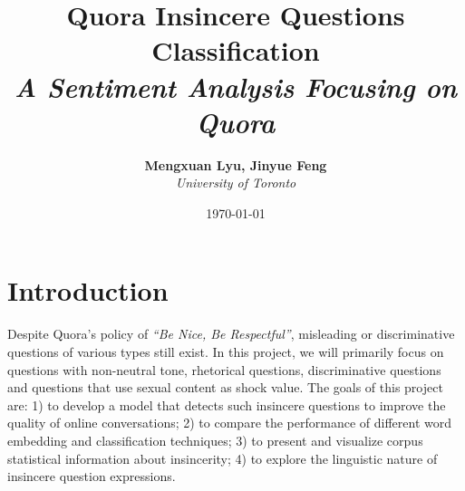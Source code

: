 \documentclass[12pt]{diazessay} %
\title{\textbf{Quora Insincere Questions Classification} \\ {\Large\itshape A Sentiment Analysis Focusing on Quora}} %
\author{\textbf{Mengxuan Lyu, Jinyue Feng} \\ \textit{University of Toronto}} %
\date{\today} %
\begin{document}
\maketitle %






\doublespacing %

\section{Introduction}

Despite Quora's policy of \textit{``Be Nice, Be Respectful''}, misleading or discriminative questions of various types still exist. In this project, we will primarily focus on questions with non-neutral tone, rhetorical questions, discriminative questions and questions that use sexual content as shock value. The goals of this project are: 1) to develop a model that detects such insincere questions to improve the quality of online conversations; 2) to compare the performance of different word embedding and classification techniques; 3) to present and visualize corpus statistical information about insincerity; 4) to explore the linguistic nature of insincere question expressions. 
\end{document}
